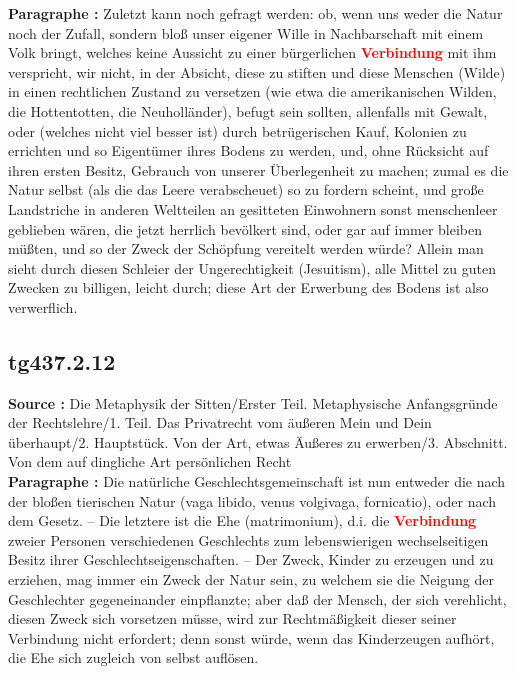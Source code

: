 \documentclass[a4paper,12pt,twoside]{book}
\newcommand{\match}[1]{\textcolor{red}{\textbf{#1}}}
\begin{document}
	\textbf{Paragraphe : }Zuletzt kann noch gefragt werden: ob, wenn uns weder die Natur noch der Zufall, sondern bloß unser eigener Wille in Nachbarschaft mit einem Volk bringt, welches keine Aussicht zu einer bürgerlichen \match{Verbindung} mit ihm verspricht, wir nicht, in der Absicht, diese zu stiften und diese Menschen (Wilde) in einen rechtlichen Zustand zu versetzen (wie etwa die amerikanischen Wilden, die Hottentotten, die Neuholländer), befugt sein sollten, allenfalls mit Gewalt, oder (welches nicht viel besser ist) durch betrügerischen Kauf, Kolonien zu errichten und so Eigentümer ihres Bodens zu werden, und, ohne Rücksicht auf ihren ersten Besitz, Gebrauch von unserer Überlegenheit zu machen; zumal es die Natur selbst (als die das Leere verabscheuet) so zu fordern scheint, und große Landstriche in anderen Weltteilen an gesitteten Einwohnern sonst menschenleer geblieben wären, die jetzt herrlich bevölkert sind, oder gar auf immer bleiben müßten, und so der Zweck der Schöpfung vereitelt werden würde? Allein man sieht durch diesen Schleier der Ungerechtigkeit (Jesuitism), alle Mittel zu guten Zwecken zu billigen, leicht durch; diese Art der Erwerbung des Bodens ist also verwerflich. 
	
	\subsection*{tg437.2.12} 
	\textbf{Source : }Die Metaphysik der Sitten/Erster Teil. Metaphysische Anfangsgründe der Rechtslehre/1. Teil. Das Privatrecht vom äußeren Mein und Dein überhaupt/2. Hauptstück. Von der Art, etwas Äußeres zu erwerben/3. Abschnitt. Von dem auf dingliche Art persönlichen Recht\\  
	
	\textbf{Paragraphe : }Die natürliche Geschlechtsgemeinschaft ist nun entweder die nach der bloßen tierischen Natur (vaga libido, venus volgivaga, fornicatio), oder nach dem Gesetz. – Die letztere ist die Ehe (matrimonium), d.i. die \match{Verbindung} zweier Personen verschiedenen Geschlechts zum lebenswierigen wechselseitigen Besitz ihrer Geschlechtseigenschaften. – Der Zweck, Kinder zu erzeugen und zu erziehen, mag immer ein Zweck der Natur sein, zu welchem sie die Neigung der Geschlechter gegeneinander einpflanzte; aber daß der Mensch, der sich verehlicht, diesen Zweck sich vorsetzen müsse, wird zur Rechtmäßigkeit dieser seiner Verbindung nicht erfordert; denn sonst würde, wenn das Kinderzeugen aufhört, die Ehe sich zugleich von selbst auflösen. 
	
\end{document}

